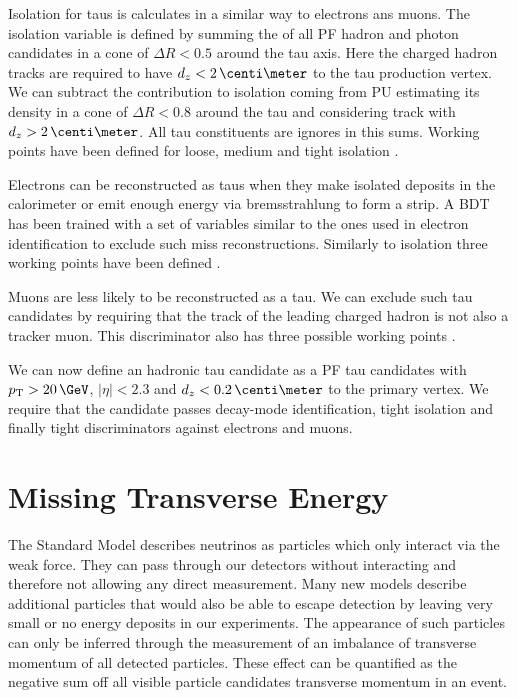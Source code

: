 
Isolation for taus is calculates in a similar way to electrons ans muons. The isolation variable is defined by summing the \pt of all \gls{PF} hadron and photon candidates in a cone of $\Delta R < 0.5$ around the tau axis. Here the charged hadron tracks are required to have $d_z < 2\,\centi\meter$ to the tau production vertex. We can subtract the contribution to isolation coming from \gls{PU} estimating its density in a cone of $\Delta R < 0.8$ around the tau and considering track with $d_z > 2\,\centi\meter$. All tau constituents are ignores in this sums. Working points have been defined for loose, medium and tight isolation \cite{ARTICLE:CMSReconstructionIndentificationTau}.

Electrons can be reconstructed as taus when they make isolated deposits in the calorimeter or emit enough energy via bremsstrahlung to form a strip. A \gls{BDT} has been trained with a set of variables similar to the ones used in electron identification to exclude such miss reconstructions. Similarly to isolation three working points have been defined \cite{ARTICLE:CMSPerformaceOfTauLeptonReconstruction,ARTICLE:CMSReconstructionIndentificationTau}. 

Muons are less likely to be reconstructed as a tau. We can exclude such tau candidates by requiring that the track of the leading charged hadron is not also a tracker muon. This discriminator also has three possible working points \cite{ARTICLE:CMSPerformaceOfTauLeptonReconstruction,ARTICLE:CMSReconstructionIndentificationTau}.

We can now define an hadronic tau candidate as a \gls{PF} tau candidates with $\pt > 20 \,\GeV$, $|\eta|<2.3$ and $d_z<0.2 \,\centi\meter$ to the primary vertex. We require that the candidate passes decay-mode identification, tight isolation and finally tight discriminators against electrons and muons.

\section{Missing Transverse Energy}
\label{SECTION:EventReconstructionAndSimulation_MET}


The Standard Model describes neutrinos as particles which only interact via the weak force. They can pass through our detectors without interacting and therefore not allowing any direct measurement. Many new models describe additional particles that would also be able to escape detection by leaving very small or no energy deposits in our experiments. The appearance of such particles can only be inferred through the measurement of an imbalance of transverse momentum of all detected particles. These effect can be quantified as the negative sum off all visible particle candidates transverse momentum in an event. 

